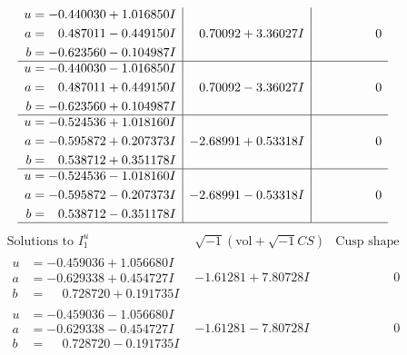 \documentclass[1p]{elsarticle_modified}
\theoremstyle{definition}
\newcommand{\I}{\sqrt{-1}}
\begin{document}
$$\begin{array}{c|c|c}
\begin{aligned}
u &= -0.440030 + 1.016850 I \\
a &= \phantom{-}0.487011 - 0.449150 I \\
b &= -0.623560 - 0.104987 I\end{aligned}
 & \phantom{-}0.70092 + 3.36027 I & \phantom{-0.000000 } 0 \\ \hline\begin{aligned}
u &= -0.440030 - 1.016850 I \\
a &= \phantom{-}0.487011 + 0.449150 I \\
b &= -0.623560 + 0.104987 I\end{aligned}
 & \phantom{-}0.70092 - 3.36027 I & \phantom{-0.000000 } 0 \\ \hline\begin{aligned}
u &= -0.524536 + 1.018160 I \\
a &= -0.595872 + 0.207373 I \\
b &= \phantom{-}0.538712 + 0.351178 I\end{aligned}
 & -2.68991 + 0.53318 I & \phantom{-0.000000 } 0 \\ \hline\begin{aligned}
u &= -0.524536 - 1.018160 I \\
a &= -0.595872 - 0.207373 I \\
b &= \phantom{-}0.538712 - 0.351178 I\end{aligned}
 & -2.68991 - 0.53318 I & \phantom{-0.000000 } 0\\
 \hline 
 \end{array}$$\newpage$$\begin{array}{c|c|c}  
\text{Solutions to }I^u_{1}& \I (\text{vol} + \sqrt{-1}CS) & \text{Cusp shape}\\
 \hline 
\begin{aligned}
u &= -0.459036 + 1.056680 I \\
a &= -0.629338 + 0.454727 I \\
b &= \phantom{-}0.728720 + 0.191735 I\end{aligned}
 & -1.61281 + 7.80728 I & \phantom{-0.000000 } 0 \\ \hline\begin{aligned}
u &= -0.459036 - 1.056680 I \\
a &= -0.629338 - 0.454727 I \\
b &= \phantom{-}0.728720 - 0.191735 I\end{aligned}
 & -1.61281 - 7.80728 I & \phantom{-0.000000 } 0 \\ \hline\begin{aligned}

\end{aligned}
\end{array}$$
\end{document}
